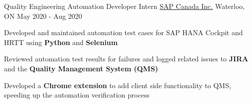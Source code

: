 \begin{cventries}
  \cventry
    {Quality Engineering Automation Developer Intern} %
    {\href{https://www.sap.com/canada/index.html}{SAP Canada Inc.}} %
    {Waterloo, ON} %
    {May 2020 - Aug 2020} %
    {
      \begin{cvitems} %
      \item {Developed and maintained automation test cases for SAP HANA Cockpit and HRTT using \textbf{Python} and \textbf{Selenium}}
		  \item {Reviewed automation test results for failures and logged related issues to \textbf{JIRA} and the \textbf{Quality Management System (QMS)}}
		  \item {Developed a \textbf{Chrome extension} to add client side functionality to QMS, speeding up the automation verification process}
      \end{cvitems}
    }
       
\end{cventries}
